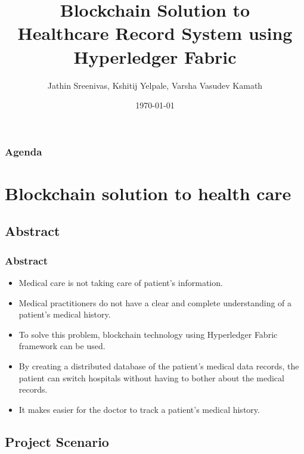 \documentclass[english,hangout]{beamer}
\title{Blockchain Solution to\\Healthcare Record System using\\Hyperledger Fabric}
\author{Jathin Sreenivas, Kshitij Yelpale, Varsha Vasudev Kamath}
\date{\today}%
\begin{document}
\begin{frame}
\titlepage
\end{frame}



\begin{frame}
   \frametitle{Agenda}
   \tableofcontents%
\end{frame}




\section{Blockchain solution to health care}

\subsection{Abstract}

\begin{frame}[fragile]
 \frametitle{Abstract}
 
  \begin{itemize}
    \item Medical care is not taking care of patient's information.
    \item Medical practitioners do not have a clear and complete understanding of a patient’s medical history.
   \item To solve this problem, blockchain technology using Hyperledger Fabric framework can be used.
   \item By creating a distributed database of the patient's medical data records, the patient can switch hospitals without having to bother about the medical records. 
   \item It makes easier for the doctor to track a patient's medical history.
  \end{itemize}
\end{frame}

\subsection{Project Scenario}
\end{document}
